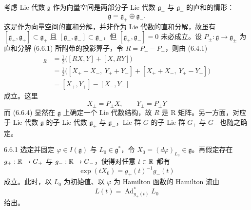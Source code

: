 考虑 Lie 代数 $\mathfrak{g}$ 作为向量空间是两部分子 Lie 代数 $\mathfrak{g}_+$ 与 $\mathfrak{g}_-$ 的直和的情形：
\begin{equation}
  \mathfrak{g} = \mathfrak{g}_+ \oplus \mathfrak{g}_-.
  \tag{6.6.1}
\end{equation}
这是作为向量空间的直和分解，并非作为 Lie 代数的直和分解，故虽有 $[\mathfrak{g}_+,\mathfrak{g}_+]\subset\mathfrak{g}_+$ 且 $[\mathfrak{g}_-,\mathfrak{g}_-]\subset\mathfrak{g}_-$，但 $[\mathfrak{g}_+,\mathfrak{g}_-]=0$ 未必成立。设 $P_\pm:\mathfrak{g}\to\mathfrak{g}_\pm$ 为直和分解 (6.6.1) 所附带的投影算子，令 $R=P_+-P_-$，则由 (6.4.1)
\begin{align}
  [X,Y]_R &= \frac{1}{2}\bigl([RX,Y] + [X,RY]\bigr) \tag{6.6.2}\\
  &= \frac{1}{2}\bigl([X_+-X_-,\ Y_++Y_-] + [X_++X_-,\ Y_+-Y_-]\bigr) \tag{6.6.3}\\
  &= [X_+,Y_+] - [X_-,Y_-] \tag{6.6.4}
\end{align}
成立。这里
\begin{equation}
  X_\pm = P_\pm X,\qquad Y_\pm = P_\pm Y
  \tag{6.6.5}
\end{equation}
而 (6.6.4) 显然在 $\mathfrak{g}$ 上确定一个 Lie 代数结构，故 $R$ 是 R 矩阵。另一方面，对应于 Lie 代数 $\mathfrak{g}$ 的子 Lie 代数 $\mathfrak{g}_+$ 与 $\mathfrak{g}_-$，Lie 群 $G$ 的子 Lie 群 $G_+$ 与 $G_-$ 也随之确定。


\begin{theorem*}{6.6.1}
  选定并固定 $\varphi\in I(\mathfrak{g})$ 与 $L_0\in\mathfrak{g}^*$，令 $X_0=(d\varphi)_{L_0}\in\mathfrak{g}$。再假定存在 $g_+:\mathbb{R}\to G_+$ 与 $g_-:\mathbb{R}\to G_-$，使得对任意 $t\in\mathbb{R}$ 都有
  \begin{equation}
    \exp(tX_0) = g_+(t)^{-1}g_-(t)
    \tag{6.6.6}
  \end{equation}
  成立。此时，以 $L_0$ 为初始值、以 $\varphi$ 为 Hamilton 函数的 Hamilton 流由
  \begin{equation}
    L(t) = \operatorname{Ad}^*_{g_+(t)}L_0
    \tag{6.6.7}
  \end{equation}
  给出。
\end{theorem*}

